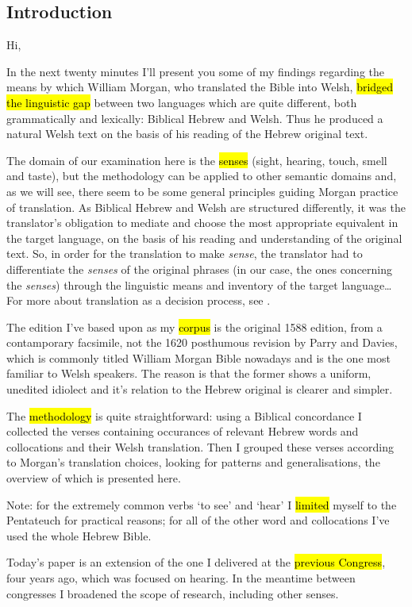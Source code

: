 \begin{paper}
	\section{Introduction}

	{\click} Hi,

	{\click} In the next twenty minutes I’ll present you some of my findings regarding the means by which William Morgan, who translated the Bible into Welsh, \hl{bridged the linguistic gap} between two languages which are quite different, both grammatically and lexically: Biblical Hebrew and Welsh. Thus he produced a natural Welsh text on the basis of his reading of the Hebrew original text.

	The domain of our examination here is the \hl{senses} (sight, hearing, touch, smell and taste), but the methodology can be applied to other semantic domains and, as we will see, there seem to be some general principles guiding Morgan practice of translation. As Biblical Hebrew and Welsh are structured differently, it was the translator’s obligation to mediate and choose the most appropriate equivalent in the target language, on the basis of his reading and understanding of the original text. So, in order for the translation to make \emph{sense}, the translator had to differentiate the \emph{senses} of the original phrases (in our case, the ones concerning the \emph{senses}) through the linguistic means and inventory of the target language… For more about translation as a decision process, see \cite{levy.j:1967:translation}.

	{\click} The edition I’ve based upon as my \hl{corpus} is the original 1588 edition, from a contamporary facsimile, not the 1620 posthumous revision by Parry and Davies, which is commonly titled William Morgan Bible nowadays and is the one most familiar to Welsh speakers. The reason is that the former shows a uniform, unedited idiolect and it’s relation to the Hebrew original is clearer and simpler.

	{\click} The \hl{methodology} is quite straightforward: using a Biblical concordance I collected the verses containing occurances of relevant Hebrew words and collocations and their Welsh translation. Then I grouped these verses according to Morgan’s translation choices, looking for patterns and generalisations, the overview of which is presented here.
	
	{\click} Note: for the extremely common verbs  ‘to see’ and  ‘hear’ I \hl{limited} myself to the Pentateuch for practical reasons; for all of the other word and collocations I’ve used the whole Hebrew Bible.

	{\click} Today’s paper is an extension of the one I delivered at the \hl{previous Congress}, four years ago, which was focused on hearing. In the meantime between congresses I broadened the scope of research, including other senses.
\end{paper}
